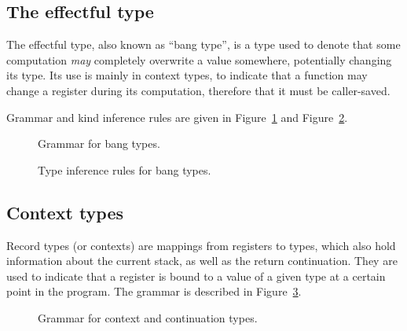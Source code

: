 \subsection{The effectful type}\label{subsec:nstar-common-ts-effect}

The effectful type, also known as ``bang type'', is a type used to denote that some computation \textit{may} completely overwrite a value somewhere, potentially changing its type.
Its use is mainly in context types, to indicate that a function may change a register during its computation, therefore that it must be caller-saved.

Grammar and kind inference rules are given in Figure~\ref{fig:nstar-common-ts-effect-syntax} and Figure~\ref{fig:nstar-common-ts-effect-kindrules}.

\begin{figure}[htb]
  \centering


  \caption{Grammar for bang types.}
  \label{fig:nstar-common-ts-effect-syntax}
\end{figure}

\begin{figure}[htb]
  \centering


  \caption{Type inference rules for bang types.}
  \label{fig:nstar-common-ts-effect-kindrules}
\end{figure}

\subsection{Context types}\label{subsec:nstar-common-ts-records}

Record types (or contexts) are mappings from registers to types, which also hold information about the current stack, as well as the return continuation.
They are used to indicate that a register is bound to a value of a given type at a certain point in the program.
The grammar is described in Figure~\ref{fig:nstar-common-ts-records-syntax}.

\begin{figure}[htb]
  \centering
  \caption{Grammar for context and continuation types.}
  \label{fig:nstar-common-ts-records-syntax}
\end{figure}

